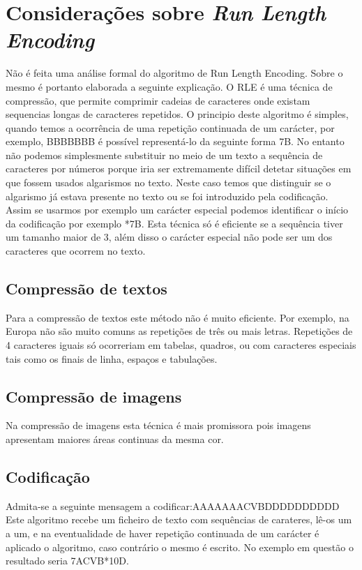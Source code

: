 \documentclass[a4paper,12pt,titlepage]{article}
\begin{document}
\section{Considerações sobre \emph{Run Length Encoding}}
Não é feita uma análise formal do algoritmo de Run Length Encoding. Sobre o mesmo é portanto elaborada a seguinte explicação.\newline
O RLE é uma técnica de compressão, que permite comprimir cadeias de caracteres onde existam sequencias longas de caracteres repetidos.\newline
O principio deste algoritmo é simples, quando temos a ocorrência de uma repetição continuada de um carácter, por exemplo, BBBBBBB é possível representá-lo da seguinte forma 7B. No entanto não podemos simplesmente substituir no meio de um texto a sequência de caracteres por números porque iria ser extremamente difícil detetar situações em que fossem usados algarismos no texto.\newline
Neste caso temos que distinguir se o algarismo já estava presente no texto ou se foi introduzido pela codificação. Assim se usarmos por exemplo um carácter especial podemos identificar o início da codificação por exemplo *7B. \newline
Esta técnica só é eficiente se a sequência tiver um tamanho maior de 3, além disso o carácter especial não pode ser um dos caracteres que ocorrem no texto.
\subsection{Compressão de textos}
Para a compressão de textos este método não é muito eficiente. Por exemplo, na Europa não são muito comuns as repetições de três ou mais  letras. Repetições de 4 caracteres iguais só ocorreriam em tabelas, quadros, ou com caracteres especiais tais como os finais de linha, espaços e tabulações.
\subsection{Compressão de imagens}
Na compressão de imagens esta técnica é mais promissora pois imagens apresentam maiores áreas continuas da mesma cor.
\subsection{Codificação}
Admita-se a seguinte mensagem a codificar:AAAAAAACVBDDDDDDDDDD\newline
Este algoritmo recebe um ficheiro de texto com sequências de carateres, lê-os um a um, e na eventualidade de haver repetição continuada de um carácter é aplicado o algoritmo, caso contrário o mesmo é escrito.
\newline
No exemplo em questão o resultado seria 7ACVB*10D.
\end{document}
